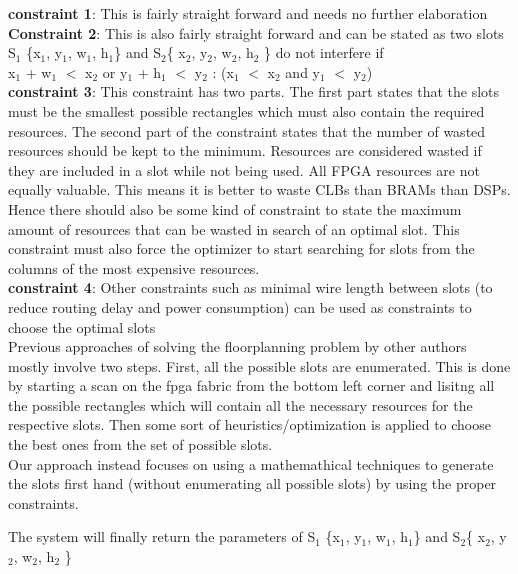 \documentclass[11pt]{article}
\theoremstyle{definition}
\begin{document}
\textbf{constraint 1}: This is fairly straight forward and needs no further elaboration \\
\textbf{Constraint 2}: This is also fairly straight forward and can be stated as two slots S$_1$ \{x$_1$, y$_1$, w$_1$, h$_1$\} and S$_2$\{ x$_2$, y$_2$, w$_2$, h$_2$ \} do not interfere if \\

\hspace{15mm}  x$_1$ + w$_1$ $<$ x$_2$ or y$_1$ + h$_1$ $<$ y$_2$ : (x$_1$ $<$ x$_2$ and y$_1$ $<$ y$_2$) \\

\textbf{constraint 3}: This constraint has two parts. The first part states that the slots must be the smallest possible rectangles which must also contain the required resources. The second part of the constraint states that the number of wasted resources should be kept to the minimum. Resources are considered wasted if they are included in a slot while not being used. All FPGA resources are not equally valuable. This means it is better to waste CLBs than BRAMs than DSPs. Hence there should also be some kind of constraint to state the maximum amount of resources that can be wasted in search of an optimal slot. This constraint must also force the optimizer to start searching for slots from the columns of the most expensive resources. \\

\textbf{constraint 4}: Other constraints such as minimal wire length between slots (to reduce routing delay and power consumption) can be used as constraints to choose the optimal slots \\
 
Previous approaches of solving the floorplanning problem by other authors mostly involve two steps. First, all the possible slots are enumerated. This is done by starting a scan on the fpga fabric from the bottom left corner and lisitng all the possible rectangles which will contain all the necessary resources for the respective slots. Then some sort of heuristics/optimization is applied to choose the best ones from the set of possible slots.\\
Our approach instead focuses on using a mathemathical techniques to generate the slots first hand (without enumerating all possible slots) by using the proper constraints. 


The system will finally return the parameters of S$_1$ \{x$_1$, y$_1$, w$_1$, h$_1$\} and S$_2$\{ x$_2$, y$_2$, w$_2$, h$_2$ \} \\
\end{document}
